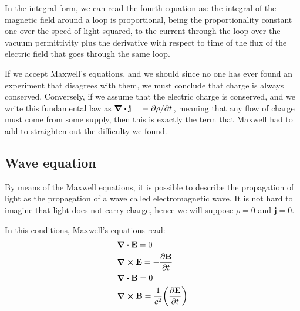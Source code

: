 \documentclass[11pt,a4paper]{article}
\begin{document}
In the integral form, we can read the fourth equation as: the integral of the magnetic field around a loop is proportional, being the proportionality constant one over the speed of light squared, to the current through the loop over the vacuum permittivity plus the derivative with respect to time of the flux of the electric field that goes through the same loop.

If we accept Maxwell's equations, and we should since no one has ever found an experiment that disagrees with them, we must conclude that charge is always conserved. Conversely, if we assume that the electric charge is conserved, and we write this fundamental law as $\div\vb{j}=-\pdv*{\rho}{t}$, meaning that any flow of charge must come from some supply, then this is exactly the term that Maxwell had to add to straighten out the difficulty we found.

\subsection{Wave equation}

By means of the Maxwell equations, it is possible to describe the propagation of light as the propagation of a wave called electromagnetic wave. It is not hard to imagine that light does not carry charge, hence we will suppose $\rho=0$ and $\textbf{j}=0$.

In this conditions, Maxwell's equations read:
\begin{subequations}\label{eq:maxwell_equations_wo_charge}
\begin{align}
&\div\vb{E}=0\label{eq:maxwell__wo_1}\\
&\curl\vb{E}=-\pdv{\vb{B}}{t}\label{eq:maxwell_wo_2}\\
&\div\vb{B}=0\label{eq:maxwell_wo_3}\\
&\curl\vb{B}=\frac{1}{c^2}\qty(\pdv{\vb{E}}{t})\label{eq:maxwell_wo_4}
\end{align}
\end{subequations}
\end{document}
